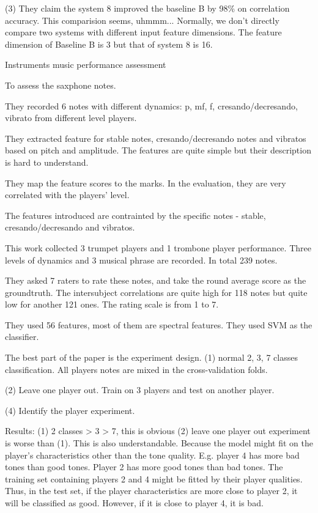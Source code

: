 (3) They claim the system 8 improved the baseline B by 98\% on correlation accuracy. This comparision seems, uhmmm... Normally, we don't directly compare two systems with different input feature dimensions. The feature dimension of Baseline B is 3 but that of system 8 is 16.

Instruments music performance assessment

 To assess the saxphone notes.

They recorded 6 notes with different dynamics: p, mf, f, cresando/decresando, vibrato from different level players.

They extracted feature for stable notes, cresando/decresando notes and vibratos based on pitch and amplitude. The features are quite simple but their description is hard to understand.

They map the feature scores to the marks. In the evaluation, they are very correlated with the players' level.

The features introduced are contrainted by the specific notes - stable, cresando/decresando and vibratos.

 This work collected 3 trumpet players and 1 trombone player performance. Three levels of dynamics and 3 musical phrase are recorded. In total 239 notes.

They asked 7 raters to rate these notes, and take the round average score as the groundtruth. The intersubject correlations are quite high for 118 notes but quite low for another 121 ones. The rating scale is from 1 to 7. 

They used 56 features, most of them are spectral features. They used SVM as the classifier.

The best part of the paper is the experiment design.
(1) normal 2, 3, 7 classes classification. All players notes are mixed in the cross-validation folds.

(2) Leave one player out. Train on 3 players and test on another player.

(4) Identify the player experiment.

Results:
(1) 2 classes > 3 > 7, this is obvious
(2) leave one player out experiment is worse than (1). This is also understandable. Because the model might fit on the player's characteristics other than the tone quality. E.g. player 4 has more bad tones than good tones. Player 2 has more good tones than bad tones. The training set containing players 2 and 4 might be fitted by their player qualities. Thus, in the test set, if the player characteristics are more close to player 2, it will be classified as good. However, if it is close to player 4, it is bad.

